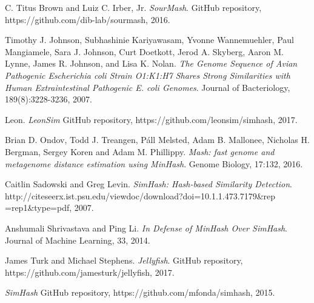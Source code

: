 \documentclass[12pt, letterpaper]{article}
\begin{document}
\begin{thebibliography}{9}

  C. Titus Brown and Luiz C. Irber, Jr.
  \textit{SourMash}.
  GitHub repository, https://github.com/dib-lab/sourmash, 2016.
  
  Timothy J. Johnson, Subhashinie Kariyawasam, Yvonne Wannemuehler, Paul Mangiamele, Sara J. Johnson, Curt Doetkott, Jerod A. Skyberg, Aaron M. Lynne, James R. Johnson, and Lisa K. Nolan.
  \textit{The Genome Sequence of Avian Pathogenic Escherichia coli Strain O1:K1:H7 Shares Strong Similarities with Human Extraintestinal Pathogenic E. coli Genomes}.
  Journal of Bacteriology, 189(8):3228-3236, 2007.
  
  Leon.
  \textit{LeonSim}
  GitHub repository, https://github.com/leonsim/simhash, 2017.
  
  Brian D. Ondov, Todd J. Treangen, Páll Melsted, Adam B. Mallonee, Nicholas H. Bergman, Sergey Koren and Adam M. Phillippy.
  \textit{Mash: fast genome and metagenome distance estimation using MinHash}.
  Genome Biology, 17:132, 2016.
  
  Caitlin Sadowski and Greg Levin.
  \textit{SimHash: Hash-based Similarity Detection}.
  http://citeseerx.ist.psu.edu/viewdoc/download?doi=10.1.1.473.7179\&rep\\=rep1\&type=pdf, 
  2007.

  Anshumali Shrivastava and Ping Li.
  \textit{In Defense of MinHash Over SimHash}.
  Journal of Machine Learning, 33, 2014.
  
  James Turk and Michael Stephens.
  \textit{Jellyfish}.
  GitHub repository, https://github.com/jamesturk/jellyfish, 2017.
  
  \textit{SimHash}
  GitHub repository, https://github.com/mfonda/simhash, 2015.
  

\end{thebibliography}
\end{document}
